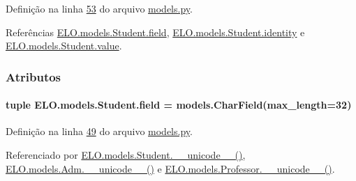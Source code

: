 Definição na linha \hyperlink{ELO_2models_8py_source_l00053}{53} do arquivo \hyperlink{ELO_2models_8py_source}{models.\-py}.



Referências \hyperlink{classELO_1_1models_1_1Student_a893ec9b2ece5c6b829fce5e5a7c1d576}{E\-L\-O.\-models.\-Student.\-field}, \hyperlink{classELO_1_1models_1_1Student_a20a7789a2b0f5b7d0c98453dcf38bc4e}{E\-L\-O.\-models.\-Student.\-identity} e \hyperlink{classELO_1_1models_1_1Student_a201226779dce6e064cb16bd92ed016e2}{E\-L\-O.\-models.\-Student.\-value}.




\subsubsection{Atributos}
\hypertarget{classELO_1_1models_1_1Student_a893ec9b2ece5c6b829fce5e5a7c1d576}{
\paragraph[{field}]{\setlength{\rightskip}{0pt plus 5cm}tuple E\-L\-O.\-models.\-Student.\-field = models.\-Char\-Field(max\-\_\-length=32)\hspace{0.3cm}{\ttfamily [static]}}}\label{classELO_1_1models_1_1Student_a893ec9b2ece5c6b829fce5e5a7c1d576}


Definição na linha \hyperlink{ELO_2models_8py_source_l00049}{49} do arquivo \hyperlink{ELO_2models_8py_source}{models.\-py}.



Referenciado por \hyperlink{classELO_1_1models_1_1Student_a2f51785c1beb3b45269a8678d97ec783}{E\-L\-O.\-models.\-Student.\-\_\-\-\_\-unicode\-\_\-\-\_\-()}, \hyperlink{classELO_1_1models_1_1Adm_a3541c3ae12b8d2da3f44ac6be00a23e6}{E\-L\-O.\-models.\-Adm.\-\_\-\-\_\-unicode\-\_\-\-\_\-()} e \hyperlink{classELO_1_1models_1_1Professor_aefc9d63d429e19ec3487a7879879f29d}{E\-L\-O.\-models.\-Professor.\-\_\-\-\_\-unicode\-\_\-\-\_\-()}.

